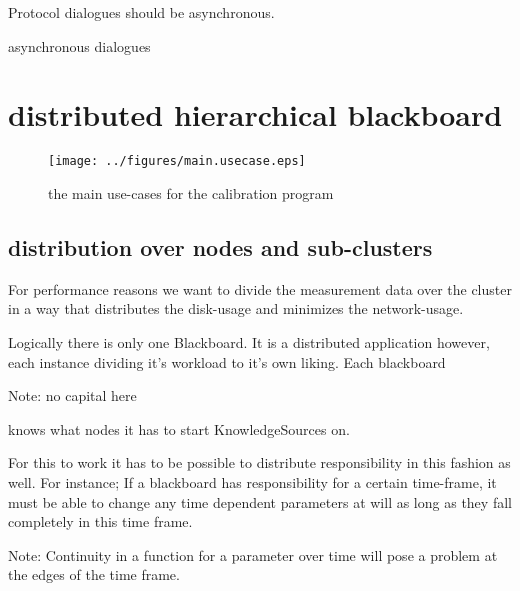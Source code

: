 \documentclass[]{lofar}
\begin{document}
      \begin{requirement}
        Protocol dialogues should be asynchronous.
        \caption{asynchronous dialogues\label{req:asynchronous}}
      \end{requirement}

  \section{distributed hierarchical blackboard}
  \label{sec:distributed-hierarchical-blackboard}\hypertarget{sec:distributed-hierarchical-blackboard}{}%


      \begin{figure}
        \texttt{[image: ../figures/main.usecase.eps]}
        \hypertarget{fig:main.usecase}{}
        \caption{the main use-cases for the calibration program\label{fig:main.usecase}}
      \end{figure}

    \subsection{distribution over nodes and sub-clusters}
    \label{subsec:distribution}\hypertarget{subsec:distribution}{}%

      For performance reasons we want to divide the measurement data
      over the cluster in a way that distributes the disk-usage and
      minimizes the network-usage.

      Logically there is only one Blackboard. It is a distributed
      application however, each instance dividing it's workload to
      it's own liking. Each blackboard
      \begin{em}\large{Note: }
        no capital here
      \end{em}
      knows what nodes it has to start KnowledgeSources on.

      For this to work it has to be possible to distribute
      responsibility in this fashion as well. For instance; If a
      blackboard has responsibility for a certain time-frame, it must
      be able to change any time dependent parameters at will as long
      as they fall completely in this time frame.
      \begin{em}\large{Note: }Continuity in a function for a parameter over time will pose a problem at the edges of the time frame.\end{em}
\end{document}
